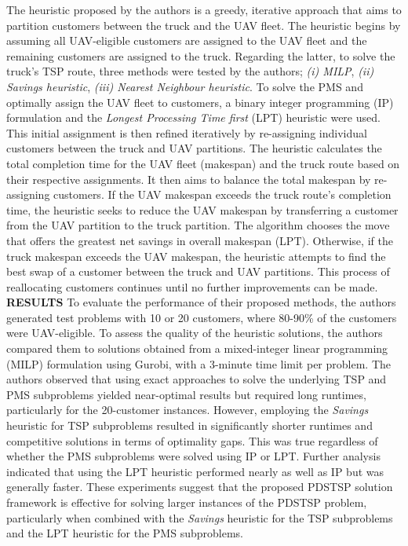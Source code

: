 \documentclass{article}
\begin{document}
	 The heuristic proposed by the authors is a greedy, iterative approach that aims to partition customers between the truck and the UAV fleet. The heuristic begins by assuming all UAV-eligible customers are assigned to the UAV fleet and the remaining customers are assigned to the truck. Regarding the latter, to solve the truck's TSP route, three methods were tested by the authors; \textit{(i) MILP}, \textit{(ii) Savings heuristic}, \textit{(iii) Nearest Neighbour heuristic}. To solve the PMS and optimally assign the UAV fleet to customers, a binary integer programming (IP) formulation and the \textit{Longest Processing Time first} (LPT) heuristic were used. This initial assignment is then refined iteratively by re-assigning individual customers between the truck and UAV partitions. The heuristic calculates the total completion time for the UAV fleet (makespan) and the truck route based on their respective assignments. It then aims to balance the total makespan by re-assigning customers. If the UAV makespan exceeds the truck route's  completion time, the heuristic seeks to reduce the UAV makespan by transferring a customer from the UAV partition to the truck partition. The algorithm chooses the move that offers the greatest net savings in overall makespan (LPT). Otherwise, if the truck makespan exceeds the UAV makespan, the heuristic attempts to find the best swap of a customer between the truck and UAV partitions. This process of reallocating customers continues until no further improvements can be made. \textbf{RESULTS} To evaluate the performance of their proposed methods, the authors generated test problems with 10 or 20 customers, where 80-90\% of the customers were UAV-eligible. To assess the quality of the heuristic solutions, the authors compared them to solutions obtained from a mixed-integer linear programming (MILP) formulation using Gurobi, with a 3-minute time limit per problem. The authors observed that using exact approaches to solve the underlying TSP and PMS subproblems yielded near-optimal results but required long runtimes, particularly for the 20-customer instances. However, employing the \textit{Savings} heuristic for TSP subproblems resulted in significantly shorter runtimes and competitive solutions in terms of optimality gaps. This was true regardless of whether the PMS subproblems were solved using IP or LPT. Further analysis indicated that using the LPT heuristic performed nearly as well as IP but was generally faster. These experiments suggest that the proposed PDSTSP solution framework is effective for solving larger instances of the PDSTSP problem, particularly when combined with the \textit{Savings} heuristic for the TSP subproblems and the LPT heuristic for the PMS subproblems.
\end{document}
